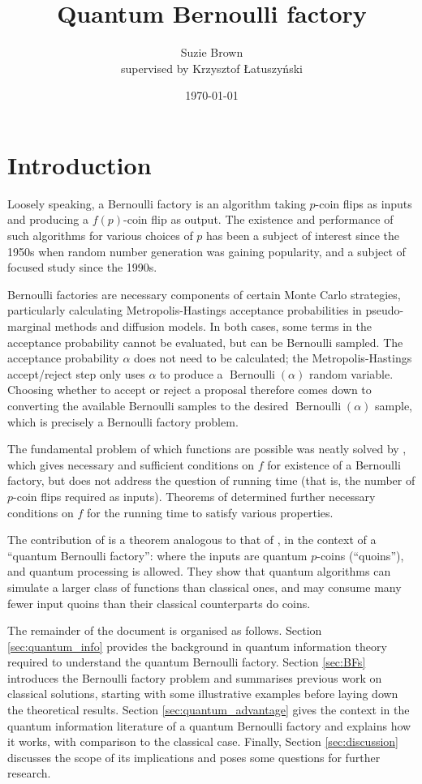 \documentclass{article}
\title{Quantum Bernoulli factory}
\author{Suzie Brown \\ {\small supervised by Krzysztof \L atuszy\'nski}}
\date{\today}
\theoremstyle{definition}
\newcommand{\Bern}{\operatorname{Bernoulli}}
\begin{document}
\maketitle

\section{Introduction}
Loosely speaking, a Bernoulli factory is an algorithm taking $p$-coin flips as inputs and producing a $f(p)$-coin flip as output.
The existence and performance of such algorithms for various choices of $p$ has been a subject of interest since the 1950s when random number generation was gaining popularity, and a subject of focused study since the 1990s.

Bernoulli factories are necessary components of certain Monte Carlo strategies, particularly calculating Metropolis-Hastings acceptance probabilities in pseudo-marginal methods and diffusion models. 
In both cases, some terms in the acceptance probability cannot be evaluated, but can be Bernoulli sampled. The acceptance probability $\alpha$ does not need to be calculated; the Metropolis-Hastings accept/reject step only uses $\alpha$ to produce a $\Bern(\alpha)$ random variable. Choosing whether to accept or reject a proposal therefore comes down to converting the available Bernoulli samples to the desired $\Bern(\alpha)$ sample, which is precisely a Bernoulli factory problem.

The fundamental problem of which functions are possible was neatly solved by \citet{keane1994}, which gives necessary and sufficient conditions on $f$ for existence of a Bernoulli factory, but does not address the question of running time (that is, the number of $p$-coin flips required as inputs).
Theorems of \citet{nacu2005} determined further necessary conditions on $f$ for the running time to satisfy various properties.

The contribution of \citet{dale2015} is a theorem analogous to that of \citet{keane1994}, in the context of a ``quantum Bernoulli factory'': where the inputs are quantum $p$-coins (``quoins''), and quantum processing is allowed.
They show that quantum algorithms can simulate a larger class of functions than classical ones, and may consume many fewer input quoins than their classical counterparts do coins.


The remainder of the document is organised as follows.
Section \ref{sec:quantum_info} provides the background in quantum information theory required to understand the quantum Bernoulli factory. 
Section \ref{sec:BFs} introduces the Bernoulli factory problem and summarises previous work on classical solutions, starting with some illustrative examples before laying down the theoretical results.
Section \ref{sec:quantum_advantage} gives the context in the quantum information literature of a quantum Bernoulli factory and explains how it works, with comparison to the classical case.
Finally, Section \ref{sec:discussion} discusses the scope of its implications and poses some questions for further research.
\end{document}
